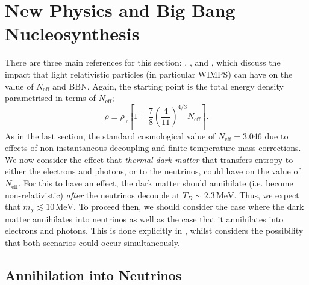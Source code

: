 \documentclass[11pt]{article}
\numberwithin{equation}{section}
\numberwithin{figure}{section}
\numberwithin{table}{section}
\begin{document}
\section{New Physics and Big Bang Nucleosynthesis} \label{sec:newphys}

There are three main references for this section: \citet{Boehm:2013jpa}, \cite{Nollett:2014lwa}, and \citet{Escudero:2018mvt}, which discuss the impact that light relativistic particles (in particular WIMPS) can have on the value of $N_{\mathrm{eff}}$ and BBN. Again, the starting point is the total energy density parametrised in terms of $N_{\mathrm{eff}}$;
\begin{equation}\label{eq:neffwimp}
\rho \equiv \rho_{\gamma}\left[1+\frac{7}{8}\left(\frac{4}{11}\right)^{4 / 3} N_{\mathrm{eff}}\right].
\end{equation}
As in the last section, the standard cosmological value of $N_{\mathrm{eff}} = 3.046$ due to effects of non-instantaneous decoupling and finite temperature mass corrections. We now consider the effect that \textit{thermal dark matter} that transfers entropy to either the electrons and photons, or to the neutrinos, could have on the value of $N_{\mathrm{eff}}$. For this to have an effect, the dark matter should annihilate (i.e. become non-relativistic) \textit{after} the neutrinos decouple at $T_D \sim 2.3 \, \mathrm{MeV}$. Thus, we expect that $m_{\chi} \lesssim 10 \, \mathrm{MeV}$. To proceed then, we should consider the case where the dark matter annihilates into neutrinos as well as the case that it annihilates into electrons and photons. This is done explicitly in \citet{Boehm:2013jpa}, whilst \citet{Escudero:2018mvt} considers the possibility that both scenarios could occur simultaneously.


\subsection{Annihilation into Neutrinos}
\end{document}
